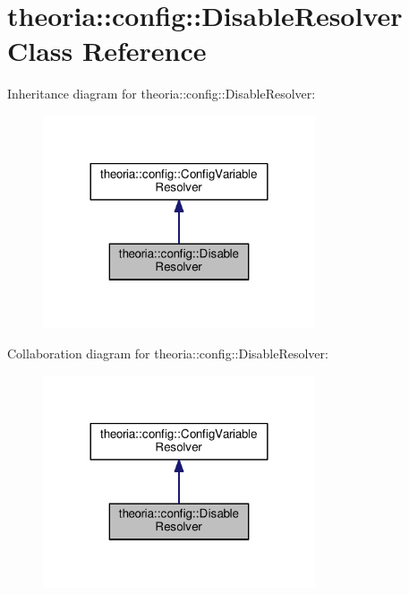 \hypertarget{classtheoria_1_1config_1_1DisableResolver}{}\section{theoria\+:\+:config\+:\+:Disable\+Resolver Class Reference}
\label{classtheoria_1_1config_1_1DisableResolver}


Inheritance diagram for theoria\+:\+:config\+:\+:Disable\+Resolver\+:
\nopagebreak
\begin{figure}[H]
\begin{center}
\leavevmode
\includegraphics[width=228pt]{classtheoria_1_1config_1_1DisableResolver__inherit__graph}
\end{center}
\end{figure}


Collaboration diagram for theoria\+:\+:config\+:\+:Disable\+Resolver\+:
\nopagebreak
\begin{figure}[H]
\begin{center}
\leavevmode
\includegraphics[width=228pt]{classtheoria_1_1config_1_1DisableResolver__coll__graph}
\end{center}
\end{figure}
